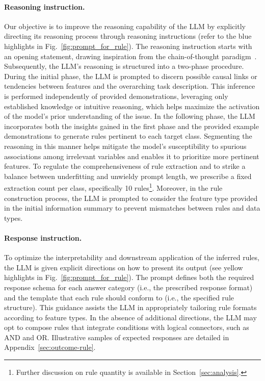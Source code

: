 \paragraph{Reasoning instruction.} Our objective is to improve the reasoning capability of the LLM by explicitly directing its reasoning process through reasoning instructions (refer to the blue highlights in Fig.~\ref{fig:prompt_for_rule}). The reasoning instruction starts with an opening statement, drawing inspiration from the chain-of-thought paradigm~\cite{wei2022chain}. Subsequently, the LLM’s reasoning is structured into a two-phase procedure. During the initial phase, the LLM is prompted to discern possible causal links or tendencies between features and the overarching task description. This inference is performed independently of provided demonstrations, leveraging only established knowledge or intuitive reasoning, which helps maximize the activation of the model’s prior understanding of the issue. In the following phase, the LLM incorporates both the insights gained in the first phase and the provided example demonstrations to generate rules pertinent to each target class. Segmenting the reasoning in this manner helps mitigate the model’s susceptibility to spurious associations among irrelevant variables and enables it to prioritize more pertinent features. To regulate the comprehensiveness of rule extraction and to strike a balance between underfitting and unwieldy prompt length, we prescribe a fixed extraction count per class, specifically 10 rules\footnote{Further discussion on rule quantity is available in Section~\ref{sec:analysis}.}. Moreover, in the rule construction process, the LLM is prompted to consider the feature type provided in the initial information summary to prevent mismatches between rules and data types. 

\vspace*{-0.12in}
\paragraph{Response instruction.} To optimize the interpretability and downstream application of the inferred rules, the LLM is given explicit directions on how to present its output (see yellow highlights in Fig.~\ref{fig:prompt_for_rule}). The prompt defines both the required response schema for each answer category (i.e., the prescribed response format) and the template that each rule should conform to (i.e., the specified rule structure). This guidance assists the LLM in appropriately tailoring rule formats according to feature types. In the absence of additional directions, the LLM may opt to compose rules that integrate conditions with logical connectors, such as AND and OR. Illustrative samples of expected responses are detailed in Appendix~\ref{sec:outcome-rule}.

